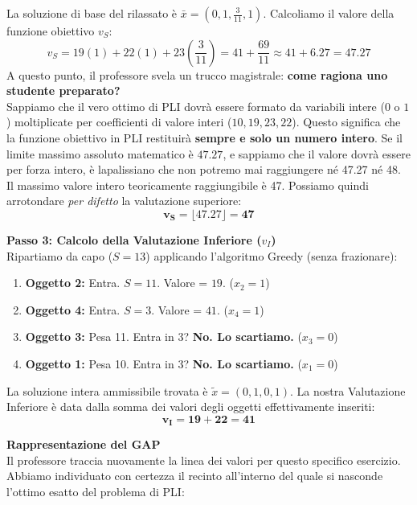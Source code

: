 \documentclass[12pt, a4paper]{article}
\begin{document}
	La soluzione di base del rilassato è $\bar{x} = \left(0, 1, \frac{3}{11}, 1\right)$.
	Calcoliamo il valore della funzione obiettivo $v_S$:
	\[
	v_S = 19(1) + 22(1) + 23\left(\frac{3}{11}\right) = 41 + \frac{69}{11} \approx 41 + 6.27 = \mathbf{47.27}
	\]
	A questo punto, il professore svela un trucco magistrale: \textbf{come ragiona uno studente preparato?}\\
	Sappiamo che il vero ottimo di PLI dovrà essere formato da variabili intere ($0$ o $1$) moltiplicate per coefficienti di valore interi ($10, 19, 23, 22$). Questo significa che la funzione obiettivo in PLI restituirà \textbf{sempre e solo un numero intero}. 
	Se il limite massimo assoluto matematico è $47.27$, e sappiamo che il valore dovrà essere per forza intero, è lapalissiano che non potremo mai raggiungere né 47.27 né 48. Il massimo valore intero teoricamente raggiungibile è 47.
	Possiamo quindi arrotondare \textit{per difetto} la valutazione superiore:
	\[
	\mathbf{v_S = \lfloor 47.27 \rfloor = 47}
	\]
	
	\vspace{0.4cm}
	\textbf{Passo 3: Calcolo della Valutazione Inferiore ($v_I$)}\\
	Ripartiamo da capo ($S=13$) applicando l'algoritmo Greedy (senza frazionare):
	\begin{enumerate}
		\item \textbf{Oggetto 2:} Entra. $S = 11$. Valore = $19$. ($x_2 = 1$)
		\item \textbf{Oggetto 4:} Entra. $S = 3$. Valore = $41$. ($x_4 = 1$)
		\item \textbf{Oggetto 3:} Pesa 11. Entra in 3? \textbf{No. Lo scartiamo.} ($x_3 = 0$)
		\item \textbf{Oggetto 1:} Pesa 10. Entra in 3? \textbf{No. Lo scartiamo.} ($x_1 = 0$)
	\end{enumerate}
	La soluzione intera ammissibile trovata è $\tilde{x} = (0, 1, 0, 1)$.
	La nostra Valutazione Inferiore è data dalla somma dei valori degli oggetti effettivamente inseriti:
	\[
	\mathbf{v_I = 19 + 22 = 41}
	\]
	
	\vspace{0.4cm}
	\textbf{Rappresentazione del GAP}\\
	Il professore traccia nuovamente la linea dei valori per questo specifico esercizio. Abbiamo individuato con certezza il recinto all'interno del quale si nasconde l'ottimo esatto del problema di PLI:
	
\end{document}
